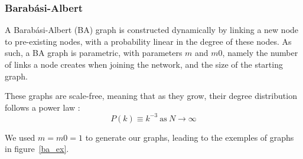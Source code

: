 \documentclass[10pt,a4paper]{scrartcl}
\begin{document}
\subsubsection{Barabási-Albert}
A Barabási-Albert (BA) graph is constructed dynamically by linking a new node to pre-existing nodes, with a probability linear in the degree of these nodes. As such, a BA graph is parametric, with parameters $m$ and $m0$, namely the number of links a node creates when joining the network, and the size of the starting graph.

These graphs are scale-free, meaning that as they grow, their degree distribution follows a power law :
$$P(k) \equiv k^{-3}~\text{as}~N\rightarrow \infty$$

We used $m=m0=1$ to generate our graphs, leading to the exemples of graphs in figure~\ref{ba_ex}.
\end{document}
